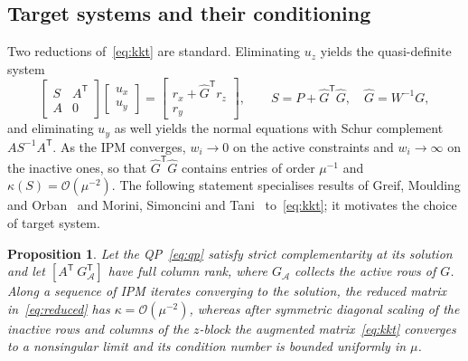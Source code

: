 \documentclass[11pt]{article}
\newtheorem{proposition}[theorem]{Proposition}
\theoremstyle{definition}
\newcommand{\Ghat}{\hat G}
\newcommand{\T}{^{\mathsf T}}
\newcommand{\bigO}{\mathcal{O}}
\begin{document}
\subsection{Target systems and their conditioning}
Two reductions of~\eqref{eq:kkt} are standard. Eliminating $u_z$ yields the quasi-definite system
\begin{equation}\label{eq:reduced}
\begin{bmatrix} S & A\T\\ A & 0\end{bmatrix}\begin{bmatrix}u_x\\u_y\end{bmatrix}=\begin{bmatrix} r_x + \Ghat\T r_z\\ r_y\end{bmatrix},\qquad S = P + \Ghat\T\Ghat,\quad \Ghat = W^{-1}G,
\end{equation}
and eliminating $u_y$ as well yields the normal equations with Schur complement $AS^{-1}A\T$. As the IPM converges, $w_i\to0$ on the active constraints and $w_i\to\infty$ on the inactive ones, so that $\Ghat\T\Ghat$ contains entries of order $\mu^{-1}$ and $\kappa(S)=\bigO(\mu^{-2})$. The following statement specialises results of Greif, Moulding and Orban~\cite{greif2014bounds} and Morini, Simoncini and Tani~\cite{morini2016spectral} to~\eqref{eq:kkt}; it motivates the choice of target system.
\begin{proposition}\label{prop:cond}
Let the QP~\eqref{eq:qp} satisfy strict complementarity at its solution and let $[A\T\ G_{\mathcal A}\T]$ have full column rank, where $G_{\mathcal A}$ collects the active rows of $G$. Along a sequence of IPM iterates converging to the solution, the reduced matrix in~\eqref{eq:reduced} has $\kappa=\bigO(\mu^{-2})$, whereas after symmetric diagonal scaling of the inactive rows and columns of the $z$-block the augmented matrix~\eqref{eq:kkt} converges to a nonsingular limit and its condition number is bounded uniformly in $\mu$.
\end{proposition}
\end{document}
